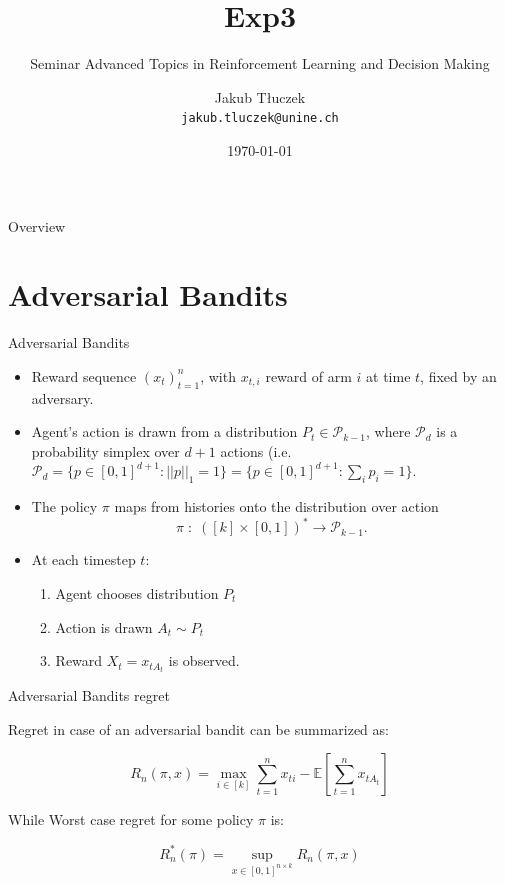 \documentclass[aspectratio=169,xcolor=dvipsnames]{beamer}
\title[short title]{Exp3}
\subtitle{Seminar Advanced Topics in Reinforcement Learning and Decision Making }
\author[Kuba] {Jakub Tłuczek \\ \texttt{jakub.tluczek@unine.ch}}
\institute[UniNE] %
{
    Universite de Neuchâtel\\
    Swiss Joint Master in Computer Science
    \vskip 3pt
}
\date{\today} %
\begin{document}
\begin{frame}
    \titlepage
\end{frame}

\begin{frame}{Overview}
    \tableofcontents
\end{frame}

\section{Adversarial Bandits}
\begin{frame}{Adversarial Bandits}
  \begin{itemize}
  \item Reward sequence $(x_t)_{t=1}^n$, with $x_{t,i}$ reward of arm $i$ at time $t$, \alert{fixed by an adversary}.
  \item Agent's action is drawn from a distribution $P_t \in \mathcal{P}_{k-1}$, where $\mathcal{P}_d$ is a probability simplex over $d+1$ actions (i.e. $\mathcal{P}_d = \{ p \in [0,1]^{d+1} : ||p||_1 = 1 \} = \{ p \in [0,1]^{d+1} : \sum_i p_i = 1 \}$. 
  \item The policy $\pi$ maps from  histories onto the distribution over action
    \[
      \pi\; : \; ([k] \times [0,1])^{*} \rightarrow \mathcal{P}_{k-1}.
    \]
  \item  At each timestep $t$:
    \begin{enumerate}
    \item Agent chooses distribution $P_t$
    \item Action is drawn $A_t \sim P_t$
    \item Reward $X_t = x_{t A_t}$ is observed.
    \end{enumerate}
  \end{itemize}
\end{frame}

\begin{frame}{Adversarial Bandits regret}

    Regret in case of an adversarial bandit can be summarized as:

    \begin{equation}
        R_n(\pi, x) = \max_{i \in [k]} \sum_{t=1}^n x_{ti} - \mathbb{E}\left[ \sum_{t=1}^n x_{t A_t}\right]
    \end{equation}

    While Worst case regret for some policy $\pi$ is:

    \begin{equation}
        R^{*}_n(\pi) = \sup_{x \in [0,1]^{n \times k}} R_n(\pi, x)
    \end{equation}
\end{frame}
\end{document}
